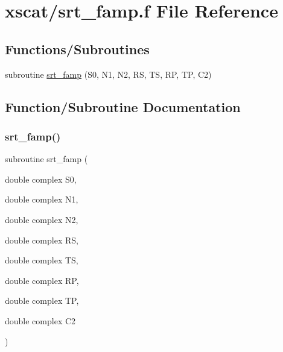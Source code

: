 \hypertarget{xscat_2srt__famp_8f}{}\section{xscat/srt\+\_\+famp.f File Reference}
\label{xscat_2srt__famp_8f}
\subsection*{Functions/\+Subroutines}
\begin{DoxyCompactItemize}
\item 
subroutine \hyperlink{xscat_2srt__famp_8f_a452255f6aeaf3544663ea78f20d4e260}{srt\+\_\+famp} (S0, N1, N2, RS, TS, RP, TP, C2)
\end{DoxyCompactItemize}


\subsection{Function/\+Subroutine Documentation}
\mbox{\label{xscat_2srt__famp_8f_a452255f6aeaf3544663ea78f20d4e260}} 
\subsubsection{\texorpdfstring{srt\+\_\+famp()}{srt\_famp()}}
{\footnotesize\ttfamily subroutine srt\+\_\+famp (\begin{DoxyParamCaption}\item[{double complex}]{S0,  }\item[{double complex}]{N1,  }\item[{double complex}]{N2,  }\item[{double complex}]{RS,  }\item[{double complex}]{TS,  }\item[{double complex}]{RP,  }\item[{double complex}]{TP,  }\item[{double complex}]{C2 }\end{DoxyParamCaption})}

